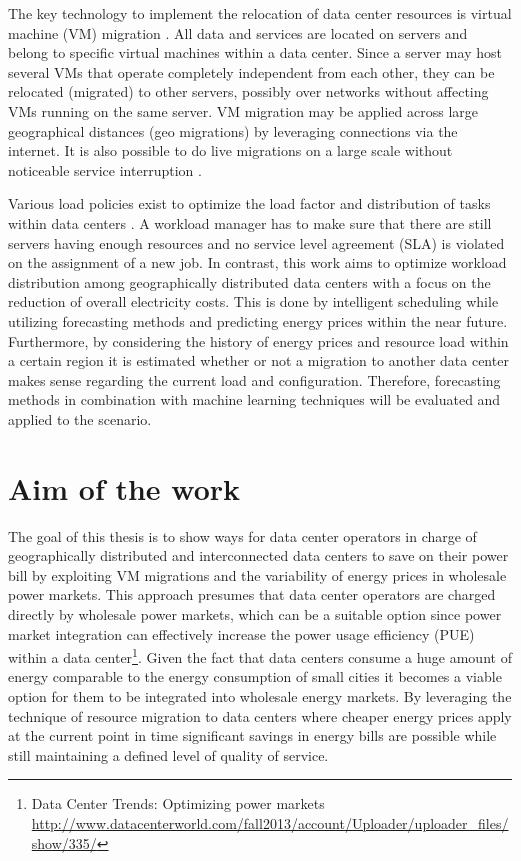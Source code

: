 The key technology to implement the relocation of data center resources is virtual machine (VM) migration \cite{nelson2009virtual}. All data and services are located on servers and belong to specific virtual machines within a data center. Since a server may host several VMs that operate completely independent from each other, they can be relocated (migrated) to other servers, possibly over networks without affecting VMs running on the same server. VM migration may be applied across large geographical distances (geo migrations) by leveraging connections via the internet. It is also possible to do live migrations on a large scale without noticeable service interruption \cite{celesti2010improving}. 

Various load policies exist to optimize the load factor and distribution of tasks within data centers \cite{buyya2010energy}. A workload manager has to make sure that there are still servers having enough resources and no service level agreement (SLA) is violated on the assignment of a new job. 
In contrast, this work aims to optimize workload distribution among geographically distributed data centers with a focus on the reduction of overall electricity costs. This is done by intelligent scheduling while utilizing forecasting methods and predicting energy prices within the near future. 
Furthermore, by considering the history of energy prices and resource load within a certain region it is estimated whether or not a migration to another data center makes sense regarding the current load and configuration. Therefore, forecasting methods in combination with machine learning techniques will be evaluated and applied to the scenario. 

\section{Aim of the work}

The goal of this thesis is to show ways for data center operators in charge of geographically distributed and interconnected data centers to save on their power bill by exploiting VM migrations and the variability of energy prices in wholesale power markets. This approach presumes that data center operators are charged directly by wholesale power markets, which can be a suitable option since power market integration can effectively increase the power usage efficiency (PUE) within a data center\footnote{Data Center Trends: Optimizing power markets \url{http://www.datacenterworld.com/fall2013/account/Uploader/uploader\_files/show/335/}}. Given the fact that data centers consume a huge amount of energy comparable to the energy consumption of small cities\cite{qureshi2009cutting} it becomes a viable option for them to be integrated into wholesale energy markets. By leveraging the technique of resource migration to data centers where cheaper energy prices apply at the current point in time significant savings in energy bills are possible while still maintaining a defined level of quality of service. 

